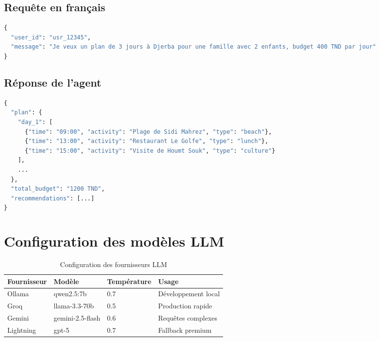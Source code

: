 \subsection{Requête en français}

\begin{lstlisting}[language=Python, caption=Exemple de requête utilisateur]
{
  "user_id": "usr_12345",
  "message": "Je veux un plan de 3 jours à Djerba pour une famille avec 2 enfants, budget 400 TND par jour"
}
\end{lstlisting}

\subsection{Réponse de l'agent}

\begin{lstlisting}[language=Python, caption=Exemple de réponse structurée]
{
  "plan": {
    "day_1": [
      {"time": "09:00", "activity": "Plage de Sidi Mahrez", "type": "beach"},
      {"time": "13:00", "activity": "Restaurant Le Golfe", "type": "lunch"},
      {"time": "15:00", "activity": "Visite de Houmt Souk", "type": "culture"}
    ],
    ...
  },
  "total_budget": "1200 TND",
  "recommendations": [...]
}
\end{lstlisting}


\section{Configuration des modèles LLM}

\begin{table}[H]
    \centering
    \caption{Configuration des fournisseurs LLM}
    \label{tab:llm_config}
    \small
    \begin{tabular}{p{2cm} p{3cm} p{3cm} p{4cm}}
        \toprule
        \textbf{Fournisseur} & \textbf{Modèle} & \textbf{Température} & \textbf{Usage} \\
        \midrule
        Ollama & qwen2.5:7b & 0.7 & Développement local \\
        Groq & llama-3.3-70b & 0.5 & Production rapide \\
        Gemini & gemini-2.5-flash & 0.6 & Requêtes complexes \\
        Lightning & gpt-5 & 0.7 & Fallback premium \\
        \bottomrule
    \end{tabular}
\end{table}


